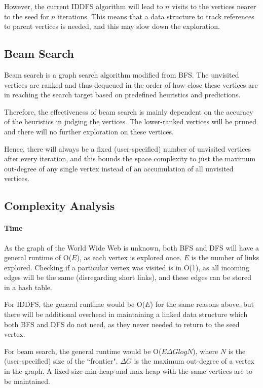 \documentclass{article}
\begin{document}
However, the current IDDFS algorithm will lead to $ n $ visits to the vertices nearer to the seed for $ n $ iterations. This means that a data structure to track references to parent vertices is needed, and this may slow down the exploration.
\newpage

\subsection{Beam Search}
\label{sec:3.4}
Beam search is a graph search algorithm modified from BFS. The unvisited vertices are ranked and thus dequeued in the order of how close these vertices are in reaching the search target based on predefined heuristics and predictions.
\medskip

Therefore, the effectiveness of beam search is mainly dependent on the accuracy of the heuristics in judging the vertices. The lower-ranked vertices will be pruned and there will no further exploration on these vertices.
\medskip

Hence, there will always be a fixed (user-specified) number of unvisited vertices after every iteration, and this bounds the space complexity to just the maximum out-degree of any single vertex instead of an accumulation of all unvisited vertices.

\subsection{Complexity Analysis}
\paragraph{Time}
As the graph of the World Wide Web is unknown, both BFS and DFS will have a general runtime of O($ E $), as each vertex is explored once. $ E $ is the number of links explored. Checking if a particular vertex was visited is in O(1), as all incoming edges will be the same (disregarding short links), and these edges can be stored in a hash table.
\medskip

For IDDFS, the general runtime would be O($ E $) for the same reasons above, but there will be additional overhead in maintaining a linked data structure which both BFS and DFS do not need, as they never needed to return to the seed vertex.
\medskip

For beam search, the general runtime would be O($ E\Delta GlogN $), where $ N $ is the (user-specified) size of the ``frontier". $ \Delta G $ is the maximum out-degree of a vertex in the graph. A fixed-size min-heap and max-heap with the same vertices are to be maintained.
\medskip
\end{document}
